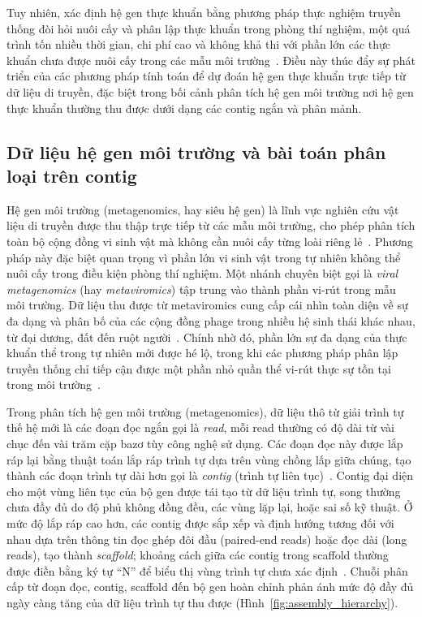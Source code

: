 Tuy nhiên, xác định hệ gen thực khuẩn bằng phương pháp thực nghiệm truyền thống đòi hỏi nuôi cấy và phân lập thực khuẩn trong phòng thí nghiệm, một quá trình tốn nhiều thời gian, chi phí cao và không khả thi với phần lớn các thực khuẩn chưa được nuôi cấy trong các mẫu môi trường~\cite{shang2023phatyp}. Điều này thúc đẩy sự phát triển của các phương pháp tính toán để dự đoán hệ gen thực khuẩn trực tiếp từ dữ liệu di truyền, đặc biệt trong bối cảnh phân tích hệ gen môi trường nơi hệ gen thực khuẩn thường thu được dưới dạng các contig ngắn và phân mảnh.

\subsection{Dữ liệu hệ gen môi trường và bài toán phân loại trên contig}
\label{subsec:metagenomics}

Hệ gen môi trường (metagenomics, hay siêu hệ gen) là lĩnh vực nghiên cứu vật liệu di truyền được thu thập trực tiếp từ các mẫu môi trường, cho phép phân tích toàn bộ cộng đồng vi sinh vật mà không cần nuôi cấy từng loài riêng lẻ~\cite{mokili2012metagenomics}. Phương pháp này đặc biệt quan trọng vì phần lớn vi sinh vật trong tự nhiên không thể nuôi cấy trong điều kiện phòng thí nghiệm. Một nhánh chuyên biệt gọi là \textit{viral metagenomics} (hay \textit{metaviromics}) tập trung vào thành phần vi-rút trong mẫu môi trường. Dữ liệu thu được từ metaviromics cung cấp cái nhìn toàn diện về sự đa dạng và phân bố của các cộng đồng phage trong nhiều hệ sinh thái khác nhau, từ đại dương, đất đến ruột người~\cite{sommers2021integrating}. Chính nhờ đó, phần lớn sự đa dạng của thực khuẩn thể trong tự nhiên mới được hé lộ, trong khi các phương pháp phân lập truyền thống chỉ tiếp cận được một phần nhỏ quần thể vi-rút thực sự tồn tại trong môi trường~\cite{mokili2012metagenomics}.

Trong phân tích hệ gen môi trường (metagenomics), dữ liệu thô từ giải trình tự thế hệ mới là các đoạn đọc ngắn gọi là \textit{read}, mỗi read thường có độ dài từ vài chục đến vài trăm cặp bazơ tùy công nghệ sử dụng. Các đoạn đọc này được lắp ráp lại bằng thuật toán lắp ráp trình tự dựa trên vùng chồng lấp giữa chúng, tạo thành các đoạn trình tự dài hơn gọi là \textit{contig} (trình tự liên tục)~\cite{ayling2020metagenome}. Contig đại diện cho một vùng liên tục của bộ gen được tái tạo từ dữ liệu trình tự, song thường chưa đầy đủ do độ phủ không đồng đều, các vùng lặp lại, hoặc sai số kỹ thuật. Ở mức độ lắp ráp cao hơn, các contig được sắp xếp và định hướng tương đối với nhau dựa trên thông tin đọc ghép đôi đầu (paired-end reads) hoặc đọc dài (long reads), tạo thành \textit{scaffold}; khoảng cách giữa các contig trong scaffold thường được điền bằng ký tự ``N'' để biểu thị vùng trình tự chưa xác định~\cite{ayling2020metagenome}. Chuỗi phân cấp từ đoạn đọc, contig, scaffold đến bộ gen hoàn chỉnh phản ánh mức độ đầy đủ ngày càng tăng của dữ liệu trình tự thu được (Hình~\ref{fig:assembly_hierarchy}).

